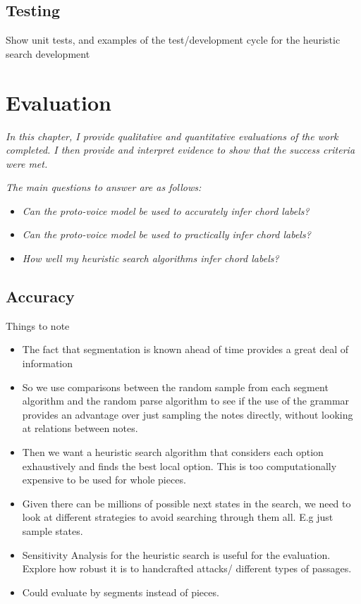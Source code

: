 \documentclass[12pt,a4paper,twoside,openright]{report}
\theoremstyle{definition}
\begin{document}
\section{Testing}
Show unit tests, and examples of the test/development cycle for the heuristic search development


\chapter{Evaluation}
\textit{In this chapter, I provide qualitative and quantitative evaluations of the work completed. I then provide and interpret evidence to show that the success criteria were met.}

\textit{The main questions to answer are as follows:}
\begin{itemize}
  \item \textit{Can the proto-voice model be used to accurately infer chord labels?}
  \item \textit{Can the proto-voice model be used to practically infer chord labels?}
  \item \textit{How well my heuristic search algorithms infer chord labels?}
\end{itemize}

\section{Accuracy}
Things to note
\begin{itemize}
  \item The fact that segmentation is known ahead of time provides a great deal of information \cite{gothamWhatIfWhen2021}
  \item So we use comparisons between the random sample from each segment algorithm and the random parse algorithm to see if the use of the grammar provides an advantage over just sampling the notes directly, without looking at relations between notes.
  \item Then we want a heuristic search algorithm that considers each option exhaustively and finds the best local option. This is too computationally expensive to be used for whole pieces. 
  \item Given there can be millions of possible next states in the search, we need to look at different strategies to avoid searching through them all. E.g just sample states. 
  \item Sensitivity Analysis for the heuristic search is useful for the evaluation. Explore how robust it is to handcrafted attacks/ different types of passages.
  \item Could evaluate by segments instead of pieces. 
\end{itemize}
\end{document}
